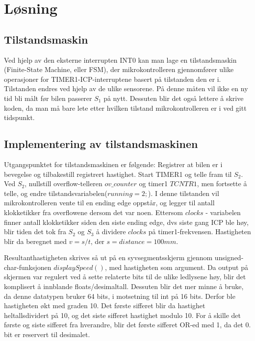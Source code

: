 \documentclass[11pt, a4paper]{report}
\begin{document}
\section{Løsning}
\subsection{Tilstandsmaskin}
Ved hjelp av den eksterne interrupten INT0 kan man lage en tilstandsmaskin (Finite-State Machine, eller FSM), der mikrokontrolleren gjennomfører ulike operasjoner for TIMER1-ICP-interruptene basert på tilstanden den er i. Tilstanden endres ved hjelp av de ulike sensorene. På denne måten vil ikke en ny tid bli målt før bilen passerer $S_{1}$ på nytt. Dessuten blir det også lettere å skrive koden, da man må bare lete etter hvilken tilstand mikrokontrolleren er i ved gitt tidspunkt. 

\subsection{Implementering av tilstandsmaskinen}
Utgangspunktet for tilstandsmaskinen er følgende: Registrer at bilen er i bevegelse og tilbakestill registrert hastighet. Start TIMER1 og telle fram til $S_{2}$. Ved $S_{2}$, nullstill overflow-telleren $ov\_counter$ og timer1 $TCNTR1$, men fortsette å telle, og endre tilstandsvariabelen($running = 2;$). I denne tilstanden vil mikrokontrolleren vente til en ending edge oppstår, og legger til antall klokketikker fra overflowene dersom det var noen. Ettersom $clocks$ - variabelen finner antall klokketikker siden den siste ending edge, dvs siste gang ICP ble høy, blir tiden det tok fra $S_{2}$ og $S_{3}$ å dividere $clocks$ på timer1-frekvensen. Hastigheten blir da beregnet med $v = s/t$, der $ s = distance = 100mm$.\newline

Resultanthastigheten skrives så ut på en syvsegmentsskjerm gjennom unsigned-char-funksjonen \newline $displaySpeed()$, med hastigheten som argument. Da output på skjermen var regulert ved å sette relaterte bits til de ulike ledlysene høy, blir det komplisert å innblande floats/desimaltall. Dessuten blir det mer minne å bruke, da denne datatypen bruker 64 bits, i motsetning til int på 16 bits. Derfor ble hastigheten økt med graden 10. Det første sifferet blir da hastighet heltallsdividert på 10, og det siste sifferet hastighet modulo 10. For å skille det første og siste sifferet fra hverandre, blir det første sifferet OR-ed med 1, da det 0. bit er reservert til desimalet. 
\end{document}

